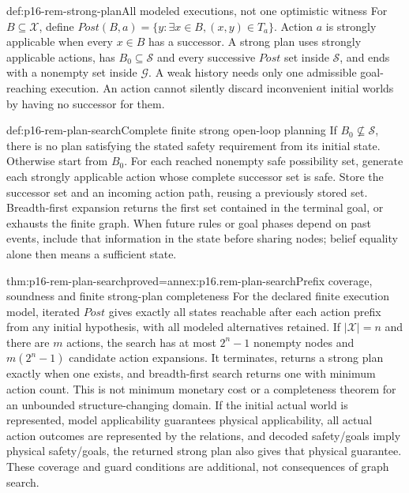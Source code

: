 \begin{hbdefinition}{def:p16-rem-strong-plan}{All modeled executions, not one optimistic witness}
For \(B\subseteq\mathcal X\), define
\(Post(B,a)=\{y:\exists x\in B,(x,y)\in T_a\}\).
Action \(a\) is strongly applicable when every \(x\in B\) has a
successor. A strong plan uses strongly applicable actions, has
\(B_0\subseteq\mathcal S\) and every successive \(Post\) set inside
\(\mathcal S\), and ends with a nonempty set inside \(\mathcal G\).
A weak history needs only one admissible goal-reaching execution.
An action cannot silently discard inconvenient initial worlds by having
no successor for them.
\end{hbdefinition}

\begin{hbmethod}{def:p16-rem-plan-search}{Complete finite strong open-loop planning}
If \(B_0\not\subseteq\mathcal S\), there is no plan satisfying the
stated safety requirement from its initial state. Otherwise start from
\(B_0\). For each reached nonempty safe possibility set, generate
each strongly applicable action whose complete successor set is safe.
Store the successor set and an incoming action path, reusing a previously
stored set. Breadth-first expansion returns the first set contained in
the terminal goal, or exhausts the finite graph. When future rules or
goal phases depend on past events, include that information in the state
before sharing nodes; belief equality alone then means a sufficient state.
\end{hbmethod}

\begin{hbtheorem}{thm:p16-rem-plan-search}{proved=annex:p16.rem-plan-search}{Prefix coverage, soundness and finite strong-plan completeness}
For the declared finite execution model, iterated \(Post\) gives exactly
all states reachable after each action prefix from any initial hypothesis,
with all modeled alternatives retained. If \(|\mathcal X|=n\) and
there are \(m\) actions, the search has at most \(2^n-1\) nonempty
nodes and \(m(2^n-1)\) candidate action expansions. It terminates,
returns a strong plan exactly when one exists, and breadth-first search
returns one with minimum action count. This is not minimum monetary cost
or a completeness theorem for an unbounded structure-changing domain.
If the initial actual world is represented, model applicability guarantees
physical applicability, all actual action outcomes are represented by the
relations, and decoded safety/goals imply physical safety/goals, the returned
strong plan also gives that physical guarantee. These coverage and guard
conditions are additional, not consequences of graph search.
\end{hbtheorem}

